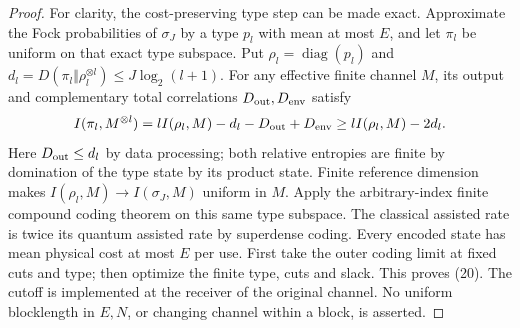 \documentclass[11pt]{article}
\begin{document}
\begin{proof}
For clarity, the cost-preserving type step can be made exact.
Approximate the Fock probabilities of \(\sigma_J\) by a type \(p_l\)
with mean at most \(E\), and let \(\pi_l\) be uniform on that exact
type subspace. Put \(\rho_l=\operatorname{diag}(p_l)\) and
\(d_l=D(\pi_l\Vert\rho_l^{\otimes l})\le J\log_2(l+1)\).
For any effective finite channel \(M\), its output and complementary
total correlations \(D_{\rm out},D_{\rm env}\) satisfy
\[
 I(\pi_l,M^{\otimes l})
 =lI(\rho_l,M)-d_l-D_{\rm out}+D_{\rm env}
 \ge lI(\rho_l,M)-2d_l .
\]
Here \(D_{\rm out}\le d_l\) by data processing; both relative entropies
are finite by domination of the type state by its product state.
Finite reference dimension makes
\(I(\rho_l,M)\to I(\sigma_J,M)\) uniform in \(M\).
Apply the arbitrary-index finite compound coding theorem
\cite[Theorem~1, Lemma~9]{compound} on this same type subspace.
The classical assisted rate is twice its quantum assisted rate by
superdense coding. Every encoded state has mean physical cost at most
\(E\) per use. First take the outer coding limit at fixed cuts and type;
then optimize the finite type, cuts and slack. This proves (20).
The cutoff is implemented at the receiver of the original channel.
No uniform blocklength in \(E,N\), or changing channel within a block,
is asserted.
\end{proof}
\end{document}
